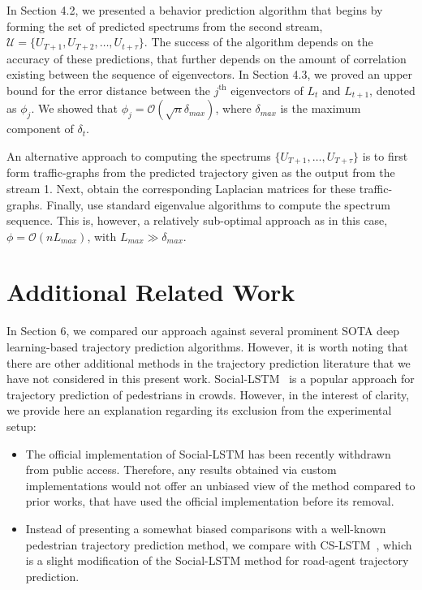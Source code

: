 \documentclass[10pt,twocolumn,letterpaper]{article}
\newcommand{\bigO}[1]{\mathcal{O}(#1)}
\newcommand{\mc}[1]{\mathcal{#1}}
\theoremstyle{plain}
\begin{document}
In Section 4.2, we presented a behavior prediction algorithm that begins by forming the set of predicted spectrums from the second stream, $\mc{U}= \{ U_{T+1}, U_{T+2}, \dots, U_{t+\tau} \}$. The success of the algorithm depends on the accuracy of these predictions, that further depends on the amount of correlation existing between the sequence of eigenvectors. In Section 4.3, we proved an upper bound for the error distance between the $j^{\textrm{th}}$ eigenvectors of $L_t$ and $L_{t+1}$, denoted as $\phi_j$. We showed that $\phi_j = \bigO{\sqrt{n} \delta_{max}}$, where $\delta_{max}$ is the maximum component of $\delta_t$.

An alternative approach to computing the spectrums $\{U_{T+1}, \ldots, U_{T+\tau}\}$ is to first form traffic-graphs from the predicted trajectory given as the output from the stream 1. Next, obtain the corresponding Laplacian matrices for these traffic-graphs. Finally, use standard eigenvalue algorithms to compute the spectrum sequence. This is, however, a relatively sub-optimal approach as in this case, $\phi = \bigO{n L_{max}}$, with $L_{max} \gg \delta_{max}$.

\section{Additional Related Work}

In Section 6, we compared our approach against several prominent SOTA deep learning-based trajectory prediction algorithms. However, it is worth noting that there are other additional methods in the trajectory prediction literature that we have not considered in this present work. Social-LSTM~\cite{social-lstm} is a popular approach for trajectory prediction of pedestrians in crowds. However, in the interest of clarity, we provide here an explanation regarding its exclusion from the experimental setup:

\begin{itemize}
    \item The official implementation of Social-LSTM has been recently withdrawn from public access. Therefore, any results obtained via custom implementations would not offer an unbiased view of the method compared to prior works, that have used the official implementation before its removal.
    
    \item Instead of presenting a somewhat biased comparisons with a well-known pedestrian trajectory prediction method, we compare with CS-LSTM~\cite{nachiket}, which is a slight modification of the Social-LSTM method for road-agent trajectory prediction.
\end{itemize}
\end{document}
